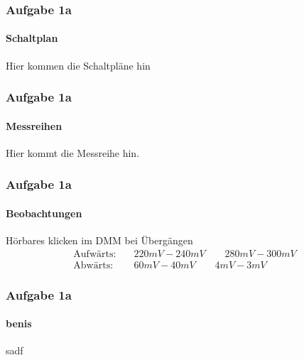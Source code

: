 \begin{frame}
    \frametitle{Aufgabe 1a}
    \framesubtitle{Schaltplan}
    Hier kommen die Schaltpläne hin
\end{frame}
\begin{frame}
    \frametitle{Aufgabe 1a}
    \framesubtitle{Messreihen}
    Hier kommt die Messreihe hin.
\end{frame}
\begin{frame}
    \frametitle{Aufgabe 1a}
    \framesubtitle{Beobachtungen}
    Hörbares klicken im DMM bei Übergängen 
    \begin{align*}
        \text{Aufwärts:}\quad&
        220mV-240mV\qquad
        280mV-300mV\\
        \text{Abwärts:}\quad&
        60mV-40mV\qquad
        4mV-3mV
    \end{align*}
    \rightarrow 
\end{frame}
\begin{frame}
    \frametitle{Aufgabe 1a}
    \framesubtitle{benis}
    sadf
\end{frame}
